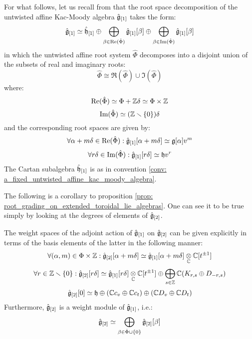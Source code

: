         \begin{remark}
            For what follows, let us recall from \cite[Chapter 7]{kac_infinite_dimensional_lie_algebras} that the root space decomposition of the untwisted affine Kac-Moody algebra $\hat{\mathfrak{g}}_{[1]}$ takes the form:
                $$\hat{\mathfrak{g}}_{[1]} \simeq \hat{\mathfrak{h}}_{[1]} \oplus \bigoplus_{\beta \in \operatorname{Re}(\hat{\Phi})} \hat{\mathfrak{g}}_{[1]}[\beta] \oplus \bigoplus_{\beta \in \operatorname{Im}(\hat{\Phi})} \hat{\mathfrak{g}}_{[1]}[\beta]$$
            in which the untwisted affine root system $\hat{\Phi}$ decomposes into a disjoint union of the subsets of real and imaginary roots:
                $$\hat{\Phi} \cong \Re(\hat{\Phi}) \cup \Im(\hat{\Phi})$$
            where:
                $$\Re(\hat{\Phi}) \cong \Phi + \Z\delta \cong \Phi \x \Z$$
                $$\operatorname{Im}(\hat{\Phi}) \simeq (\mathbb{Z} \smallsetminus \{0\})\delta$$
            and the corresponding root spaces are given by:
                $$\forall \alpha + m\delta \in \operatorname{Re}(\hat{\Phi}): \hat{\mathfrak{g}}_{[1]}[\alpha + m\delta] \simeq \mathfrak{g}[\alpha] v^m$$
                $$\forall r\delta \in \operatorname{Im}(\hat{\Phi}): \hat{\mathfrak{g}}_{[1]}[r\delta] \simeq \mathfrak{h} v^r$$
            The Cartan subalgebra $\hat{\mathfrak{h}}_{[1]}$ is as in convention \ref{conv: a_fixed_untwisted_affine_kac_moody_algebra}.
        \end{remark}    
        The following is a corollary to proposition \ref{prop: root_grading_on_extended_toroidal_lie_algebras}. One can see it to be true simply by looking at the degrees of elements of $\hat{\mathfrak{g}}_{[2]}$. 
        \begin{theorem} \label{theorem: root_space_decomposition_for_extended_toroidal_lie_algebras}
            The weight spaces of the adjoint action of $\hat{\mathfrak{g}}_{[1]}$ on $\hat{\mathfrak{g}}_{[2]}$ can be given explicitly in terms of the basis elements of the latter in the following manner:
                $$\forall (\alpha, m) \in \Phi \x \Z: \hat{\g}_{[2]}[\alpha + m\delta] \cong \hat{\g}_{[1]}[\alpha + m\delta] \tensor_{\bbC} \bbC[t^{\pm 1}]$$
                $$
                    \forall r \in \Z \setminus \{0\}: \hat{\g}_{[2]}[r \delta] \cong \hat{\g}_{[1]}[r \delta] \tensor_{\bbC} \bbC[t^{\pm 1}] \oplus \bigoplus_{s \in \Z} \bbC (K_{r, s} \oplus D_{-r, s})
                $$
                $$\hat{\mathfrak{g}}_{[2]}[0] \simeq \mathfrak{h} \oplus (\mathbb{C} c_v \oplus \mathbb{C} c_t) \oplus (\mathbb{C} D_v \oplus \mathbb{C} D_t)$$
            Furthermore, $\hat{\mathfrak{g}}_{[2]}$ is a weight module of $\hat{\mathfrak{g}}_{[1]}$, i.e.:
                $$\hat{\mathfrak{g}}_{[2]} \simeq \bigoplus_{\beta \in \hat{\Phi} \cup \{0\}} \hat{\mathfrak{g}}_{[2]}[\beta]$$
        \end{theorem}
